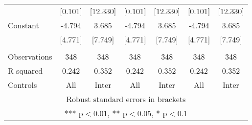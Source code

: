 \begin{tabular}{lcccccc}
 & [0.101] & [12.330] & [0.101] & [12.330] & [0.101] & [12.330] \\
Constant & -4.794 & 3.685 & -4.794 & 3.685 & -4.794 & 3.685 \\
 & [4.771] & [7.749] & [4.771] & [7.749] & [4.771] & [7.749] \\
 &  &  &  &  &  &  \\
Observations & 348 & 348 & 348 & 348 & 348 & 348 \\
R-squared & 0.242 & 0.352 & 0.242 & 0.352 & 0.242 & 0.352 \\
 Controls & All & Inter & All & Inter & All & Inter \\ \hline
\multicolumn{7}{c}{ Robust standard errors in brackets} \\
\multicolumn{7}{c}{ *** p$<$0.01, ** p$<$0.05, * p$<$0.1} \\
\end{tabular}
